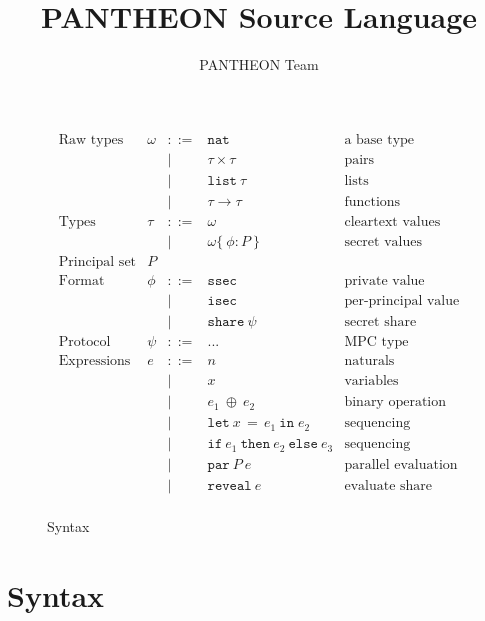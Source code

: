\documentclass[10pt]{article}
\title{PANTHEON Source Language}
\author{PANTHEON Team}
\newcommand{\kw}[1]{\ensuremath{\mathtt{#1}}}
\newcommand{\tnat}{\ensuremath{\mathtt{nat}}}
\newcommand{\tlist}[1]{\ensuremath{\mathtt{list}~{#1}}}
\newcommand{\tfun}[2]{\ensuremath{{#1} \rightarrow {#2}}}
\newcommand{\tprod}[2]{\ensuremath{{#1} \times {#2}}}
\newcommand{\ssec}{\ensuremath{\mathtt{ssec}}}
\newcommand{\isec}{\ensuremath{\mathtt{isec}}}
\newcommand{\sshare}[1]{\ensuremath{\mathtt{share}~{#1}}}
\newcommand{\sectyp}[3]{\ensuremath{{#1} \{~{#2}:{#3}~\}}}
\newcommand{\ebinop}[2]{\ensuremath{{#1}~\oplus~{#2}}}
\newcommand{\elet}[3]{\ensuremath{\kw{let}~#1\, =\, #2~\kw{in}\;{#3}}}
\newcommand{\epar}[2]{\ensuremath{\kw{par}~{#1}~{#2}}}
\newcommand{\ereveal}[1]{\ensuremath{\kw{reveal}~{#1}}}
\newcommand{\econd}[3]{\ensuremath{\kw{if}~{#1}~\kw{then}~{#2}~\kw{else}~{#3}}}
\begin{document}
\maketitle

\begin{figure}[h]
  \centering
  \[\begin{array}{rlcll}
      \text{Raw types} & \omega  & ::=  & \tnat & \text{a base type} \\      
                       && \mid & \tprod{\tau}{\tau} & \text{pairs} \\
                       && \mid & \tlist{\tau} & \text{lists} \\
                       && \mid & \tfun{\tau}{\tau} & \text{functions} \\
      \text{Types} & \tau & ::= & \omega & \text{cleartext values} \\
                       && \mid & \sectyp\omega\phi{P} & \text{secret values} \\
      \text{Principal set} & P \\
      \text{Format} & \phi & ::= & \ssec & \text{private value}  \\
                       && \mid & \isec & \text{per-principal value}  \\
                       && \mid & \sshare{\psi} & \text{secret share} \\
      \text{Protocol} & \psi & ::= & ... & \text{MPC type} \\
      \text{Expressions} & e & ::= & n & \text{naturals} \\
                       && \mid & x & \text{variables} \\
                       && \mid & \ebinop{e_1}{e_2}  & \text{binary operation} \\
                       && \mid & \elet{x}{e_1}{e_2}  & \text{sequencing} \\
                       && \mid & \econd{e_1}{e_2}{e_3}  & \text{sequencing} \\
                       && \mid & \epar{P}{e} & \text{parallel evaluation}\\
                       && \mid & \ereveal{e} & \text{evaluate share}\\
  \end{array}
  \]
  \caption{Syntax}
  \label{fig:syntax}
\end{figure}

\section{Syntax}
\end{document}
